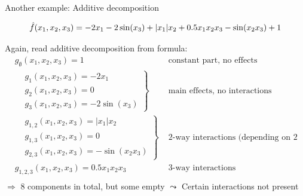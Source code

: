 \documentclass[10pt,compress,t,notes=noshow, xcolor=table]{beamer}
\begin{document}
\begin{frame}{Another example: Additive decomposition}

    \begin{example}


        $$
        \hat{f}(x_1, x_2, x_3) = - 2x_1 - 2\sin(x_3) + |x_1|x_2 + 0.5 x_1 x_2 x_3 - \sin(x_2 x_3) + 1
        $$

        Again, read additive decomposition from formula:
        \pause
        \begin{equation}\label{eq:func_decomp_second_min_example}
        \begin{aligned}
            & g_\emptyset(x_1, x_2, x_3) = 1 & \text{ constant part, no effects}  \\
            &
            \left.\begin{aligned}
                & g_1(x_1, x_2, x_3) = - 2x_1 \\
                & g_2(x_1, x_2, x_3) = 0 \\
                & g_3(x_1, x_2, x_3) = - 2\sin(x_3)
            \end{aligned}\right\}
                & \text{ main effects, no interactions}  \\
            &
            \left.\begin{aligned}
                & g_{1,2}(x_1, x_2, x_3) = |x_1|x_2 \\
                & g_{1,3}(x_1, x_2, x_3) = 0 \\
                & g_{2,3}(x_1, x_2, x_3) = - \sin(x_2 x_3)
            \end{aligned}\right\}
                & \text{ 2-way interactions (depending on 2 features)}  \\
            & g_{1,2,3}(x_1, x_2, x_3) = 0.5 x_1 x_2 x_3 & \text{ 3-way interactions}  \\
        \end{aligned}
        \end{equation}
        \(\Rightarrow\) 8 components in total, but some empty $\leadsto$ Certain interactions not present
        
    \end{example}
    
\end{frame}
\end{document}
